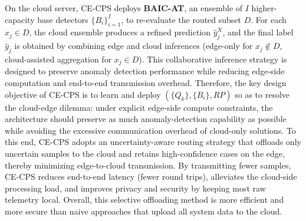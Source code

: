 \documentclass[pdflatex,sn-mathphys-num]{sn-jnl}%
\theoremstyle{thmstyleone}
\theoremstyle{thmstyletwo}%
\theoremstyle{thmstylethree}%
\begin{document}
On the cloud server, CE-CPS deploys \textbf{BAIC-AT}, an ensemble of $I$ higher-capacity base detectors $\{B_i\}_{i=1}^I$, to re-evaluate the routed subset $D$. For each $x_j\in D$, the cloud ensemble produces a refined prediction $\hat{y}^{X}_j$, and the final label $\hat{y}_j$ is obtained by combining edge and cloud inferences (edge-only for $x_j\notin D$, cloud-assisted aggregation for $x_j\in D$). This collaborative inference strategy is designed to preserve anomaly detection performance while reducing edge-side computation and end-to-end transmission overhead. Therefore, the key design objective of CE-CPS is to learn and deploy $(\{Q_k\}, \{B_i\}, RP)$ so as to resolve the cloud-edge dilemma: under explicit edge-side compute constraints, the architecture should preserve as much anomaly-detection capability as possible while avoiding the excessive communication overhead of cloud-only solutions. To this end, CE-CPS adopts an uncertainty-aware routing strategy that offloads only uncertain samples to the cloud and retains high-confidence cases on the edge, thereby minimizing edge-to-cloud transmission. By transmitting fewer samples, CE-CPS reduces end-to-end latency (fewer round trips), alleviates the cloud-side processing load, and improves privacy and security by keeping most raw telemetry local. Overall, this selective offloading method is more efficient and more secure than naive approaches that upload all system data to the cloud.
\end{document}
